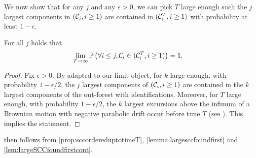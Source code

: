We now show that for any $j$ and any $\epsilon>0$, we can pick $T$ large enough such the $j$ largest components in $({\mathcal C}_i,i\geq 1)$ are contained in $({\mathcal C}^T_i,i \geq 1)$ with probability at least $1-\epsilon$.

\begin{lemma}\label{lem:largeSCCfoundfirstcont}
For all $j$ holds that 
$$\lim_{T\to\infty}{\mathbb P}\left(\forall i\leq j, {\mathcal C}_i\in ({\mathcal C}^T_i,i \geq 1)\right)=1.$$
\end{lemma}
\begin{proof}
Fix $\epsilon>0$. By \cite[Proposition 5.10]{goldschmidtScalingLimitCritical2021} adapted to our limit object, for $k$ large enough, with probability $1-\epsilon/2$, the $j$ largest components of $({\mathcal C}_i,i\geq 1)$ are contained in the $k$ largest components of the out-forest with identifications. Moreover, for $T$ large enough, with probability $1-\epsilon/2$, the $k$ largest excursions above the infimum of a Brownian motion with negative parabolic drift occur before time $T$  (see \cite[Section 3]{aldousBrownianExcursionsCritical1997}). This implies the statement.
\end{proof}
 then follows from \cref{prop:sccordereduptotimeT}, \cref{lemma.largesccfoundfirst} and \cref{lem:largeSCCfoundfirstcont}.



